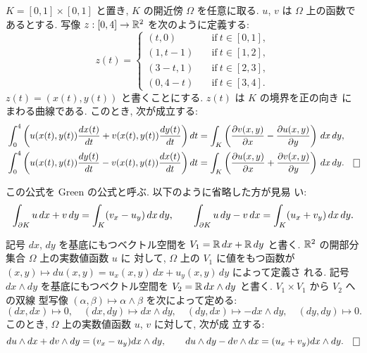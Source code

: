 \documentclass[12pt,twoside]{jarticle}
\begin{document}
\begin{question}
  $K=[0,1] \times [0,1]$ と置き, $K$ の開近傍 $\Omega$ を任意に取る. 
  $u$, $v$ は $\Omega$ 上の函数であるとする. 写像 
  $z:[0,4]\to{\mathbb R}^2$ を次のように定義する:
  \[
    z(t)=
    \begin{cases}
      (t,0)   \quad & \text{if}\ t\in [0,1], \\
      (1,t-1) \quad & \text{if}\ t\in [1,2], \\
      (3-t,1) \quad & \text{if}\ t\in [2,3], \\
      (0,4-t) \quad & \text{if}\ t\in [3,4].
    \end{cases}
  \]%
  $z(t)=(x(t),y(t))$ と書くことにする.  $z(t)$ は $K$ の境界を正の向き
  にまわる曲線である. このとき, 次が成立する:
  \begin{align*}
    &
    \int_0^4 
    \left( 
      u(x(t),y(t)) \frac{dx(t)}{dt} + v(x(t),y(t)) \frac{dy(t)}{dt}
    \right)
    dt
    =
    \int_K
    \left(
      \frac{\del v(x,y)}{\del x} - \frac{\del u(x,y)}{\del y} 
    \right)
    \,dx\,dy,
    \\
    &
    \int_0^4 
    \left( 
      u(x(t),y(t)) \frac{dy(t)}{dt} - v(x(t),y(t)) \frac{dx(t)}{dt}
    \right)
    dt
    =
    \int_K
    \left(
      \frac{\del u(x,y)}{\del x} + \frac{\del v(x,y)}{\del y} 
    \right)
    \,dx\,dy.  \qed
  \end{align*}
\end{question}

\noindent この公式を Green の公式と呼ぶ. 以下のように省略した方が見易
い:
\[
  \int_{\partial K} u \,dx + v \,dy
  =
  \int_K (v_x - u_y)\,dx\,dy,
  \qquad
  \int_{\partial K} u \,dy - v \,dx
  =
  \int_K (u_x + v_y)\,dx\,dy.
\]%

\begin{question}
  記号 $dx$, $dy$ を基底にもつベクトル空間を $V_1 = {\mathbb R}\,dx + {\mathbb R}\,dy$ 
  と書く.  ${\mathbb R}^2$ の開部分集合 $\Omega$ 上の実数値函数 $u$ に
  対して, $\Omega$ 上の $V_1$ に値をもつ函数が %
  $(x,y)\mapsto du(x,y) = u_x(x,y)\,dx + u_y(x,y)\,dy$ によって定義さ
  れる. 記号 $dx\wedge dy$ を基底にもつベクトル空間を %
  $V_2 = {\mathbb R}\,dx\wedge dy$ と書く. $V_1\times V_1$ から $V_2$ への双線
  型写像 $(\alpha,\beta)\mapsto \alpha\wedge\beta$ を次によって定める:
  \[
    (dx,dx) \mapsto 0, \quad
    (dx,dy) \mapsto dx\wedge dy, \quad
    (dy,dx) \mapsto - dx\wedge dy, \quad
    (dy,dy) \mapsto 0.
  \]%
  このとき, $\Omega$ 上の実数値函数 $u$, $v$ に対して, 次が成
  立する:
  \[
    du\wedge dx + dv\wedge dy = (v_x - u_y) dx\wedge dy,
    \qquad
    du\wedge dy - dv\wedge dx = (u_x + v_y) dx\wedge dy. \qed
  \]
\end{question}
\end{document}
